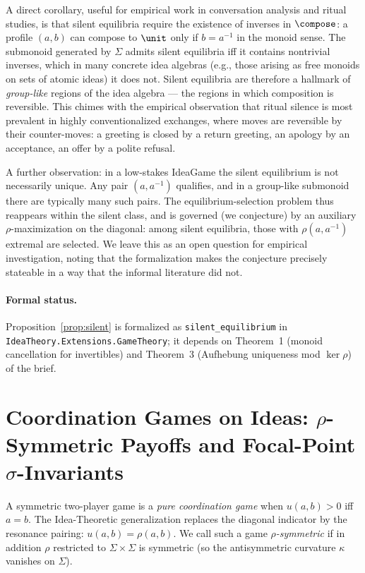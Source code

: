A direct corollary, useful for empirical work in conversation analysis
and ritual studies, is that silent equilibria require the existence of
inverses in $\compose$: a profile $(a,b)$ can compose to $\unit$ only if
$b = a^{-1}$ in the monoid sense. The submonoid generated by $\Sigma$
admits silent equilibria iff it contains nontrivial inverses, which
in many concrete idea algebras (e.g., those arising as free monoids on
sets of atomic ideas) it does not. Silent equilibria are therefore a
hallmark of \emph{group-like} regions of the idea algebra — the regions
in which composition is reversible. This chimes with the empirical
observation that ritual silence is most prevalent in highly
conventionalized exchanges, where moves are reversible by their
counter-moves: a greeting is closed by a return greeting, an apology by
an acceptance, an offer by a polite refusal.

A further observation: in a low-stakes IdeaGame the silent equilibrium
is not necessarily unique. Any pair $(a,a^{-1})$ qualifies, and in a
group-like submonoid there are typically many such pairs. The
equilibrium-selection problem thus reappears within the silent class,
and is governed (we conjecture) by an auxiliary $\rho$-maximization on
the diagonal: among silent equilibria, those with $\rho(a,a^{-1})$
extremal are selected. We leave this as an open question for empirical
investigation, noting that the formalization makes the conjecture
precisely stateable in a way that the informal literature did not.

\paragraph{Formal status.} Proposition~\ref{prop:silent} is formalized as
\texttt{silent\_equilibrium} in
\texttt{IdeaTheory.Extensions.GameTheory}; it depends on Theorem~1
(monoid cancellation for invertibles) and Theorem~3 (Aufhebung
uniqueness mod $\ker\rho$) of the brief.

\section{Coordination Games on Ideas: $\rho$-Symmetric Payoffs and
Focal-Point $\sigma$-Invariants}
\label{sec:coord}

A symmetric two-player game is a \emph{pure coordination game} when
$u(a,b) > 0$ iff $a=b$. The Idea-Theoretic generalization replaces the
diagonal indicator by the resonance pairing: $u(a,b) = \rho(a,b)$. We call
such a game \emph{$\rho$-symmetric} if in addition $\rho$ restricted to
$\Sigma\times\Sigma$ is symmetric (so the antisymmetric curvature
$\kappa$ vanishes on $\Sigma$).

